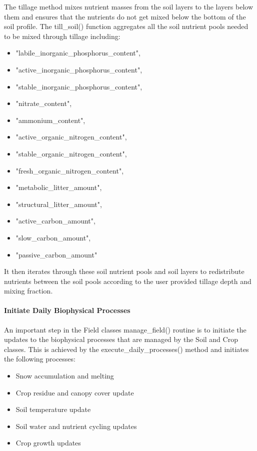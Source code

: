 The tillage method mixes nutrient masses from the soil layers to the layers below them and ensures that the nutrients do not get mixed below the bottom of the soil profile.  The till\_soil() function aggregates all the soil nutrient pools needed to be mixed through tillage including: 

\begin{itemize}
    \item "labile\_inorganic\_phosphorus\_content",
   \item "active\_inorganic\_phosphorus\_content",
   \item "stable\_inorganic\_phosphorus\_content",
   \item "nitrate\_content",
   \item "ammonium\_content",
   \item "active\_organic\_nitrogen\_content",
   \item "stable\_organic\_nitrogen\_content",
   \item "fresh\_organic\_nitrogen\_content",
   \item "metabolic\_litter\_amount",
   \item "structural\_litter\_amount",
   \item "active\_carbon\_amount",
   \item "slow\_carbon\_amount",
   \item "passive\_carbon\_amount"
\end{itemize}

It then iterates through these soil nutrient pools and soil layers to redistribute nutrients between the soil pools according to the user provided tillage depth and mixing fraction.


\paragraph{Initiate Daily Biophysical Processes}
\vspace{-0.25cm}

An important step in the Field classes manage\_field() routine is to initiate the updates to the biophysical processes that are managed by the Soil and Crop classes. This is achieved by the execute\_daily\_processes() method and initiates the following processes:
\begin{itemize}
    \item Snow accumulation and melting
    \item Crop residue and canopy cover update
    \item Soil temperature update
    \item Soil water and nutrient cycling updates
    \item Crop growth updates
\end{itemize}

